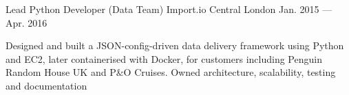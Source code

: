 \begin{cventries}
  \cventry
  {Lead Python Developer (Data Team)} %
  {Import.io } %
  {Central London} %
  {Jan. 2015 --- Apr. 2016} %
  {
    \begin{cvitems} %
    \item {Designed and built a JSON-config-driven data delivery framework using Python and EC2, later containerised with Docker, for customers including Penguin Random House UK and P\&O Cruises. Owned architecture, scalability, testing and documentation}
    \end{cvitems}
  }

\end{cventries}
